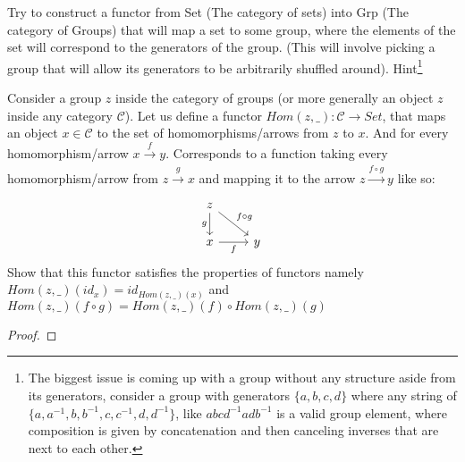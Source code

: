  
\begin{Exercise}
Try to construct a functor from Set (The category of sets) into Grp (The category of Groups) that will map a set to some group, where the elements of the set will correspond to the generators of the group. (This will involve picking a group that will allow its generators to be arbitrarily shuffled around). Hint\footnote{The biggest issue is coming up with a group without any structure aside from its generators, consider a group with generators $\{a,b,c,d\}$ where any string of $\{a,a^{-1},b,b^{-1},c,c^{-1},d,d^{-1}\}$, like $abcd^{-1}adb^{-1}$ is a valid group element, where composition is given by concatenation and then canceling inverses that are next to each other.}
\end{Exercise}
\begin{Exercise}
    Consider a group $z$ inside the category of groups (or more generally an object $z$ inside any category $\mathcal{C}$). Let us define a functor $Hom(z,\_): \mathcal{C} \rightarrow Set$, that maps an object $x \in \mathcal{C}$ to the set of homomorphisms/arrows from $z$ to $x$.  And for every homomorphism/arrow $x \xrightarrow[]{f} y$. Corresponds to a function taking every homomorphism/arrow from $z \xrightarrow[]{g} x$ and mapping it to the arrow  $z \xrightarrow[]{f \circ g} y$ like so:
\[\begin{tikzcd}
	z \\
	x & y
	\arrow["g"', from=1-1, to=2-1]
	\arrow["{f \circ g}", from=1-1, to=2-2]
	\arrow["f"', from=2-1, to=2-2]
\end{tikzcd}\]
    Show that this functor satisfies the properties of functors namely $Hom(z,\_)(id_x)= id_{Hom(z,\_)(x)}$ and $Hom(z,\_)(f \circ g) =Hom(z,\_)(f)  \circ Hom(z,\_)(g)  $ 

    \begin{proof}
        
    \end{proof}
\end{Exercise}







